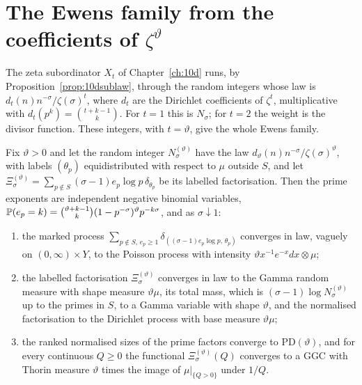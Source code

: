 \section{The Ewens family from the coefficients of \texorpdfstring{$\zeta^\vartheta$}{zeta to the theta}}\label{sec:pdtheta}

The zeta subordinator $X_t$ of Chapter~\ref{ch:10d} runs, by Proposition~\ref{prop:10dsublaw}, through the random integers whose law is $d_t(n)n^{-\sigma}/\zeta(\sigma)^t$, where $d_t$ are the Dirichlet coefficients of $\zeta^t$, multiplicative with $d_t(p^k)=\binom{t+k-1}k$. For $t=1$ this is $N_\sigma$; for $t=2$ the weight is the divisor function. These integers, with $t=\vartheta$, give the whole Ewens family.

\begin{theorem}\label{thm:pdtheta}
Fix $\vartheta>0$ and let the random integer $N_\sigma^{(\vartheta)}$ have the law $d_\vartheta(n)n^{-\sigma}/\zeta(\sigma)^\vartheta$, with labels $(\theta_p)$ equidistributed with respect to $\mu$ outside $S$, and let $\Xi^{(\vartheta)}_\sigma=\sum_{p\notin S}(\sigma-1)e_p\log p\,\delta_{\theta_p}$ be its labelled factorisation. Then the prime exponents are independent negative binomial variables, $\mathbb{P}(e_p=k)=\binom{\vartheta+k-1}k(1-p^{-\sigma})^\vartheta p^{-k\sigma}$, and as $\sigma\downarrow1$:
\begin{enumerate}
\item[(i)] the marked process $\sum_{p\notin S,\,e_p\ge1}\delta_{((\sigma-1)e_p\log p,\,\theta_p)}$ converges in law, vaguely on $(0,\infty)\times Y$, to the Poisson process with intensity $\vartheta x^{-1}e^{-x}dx\otimes\mu$;
\item[(ii)] the labelled factorisation $\Xi^{(\vartheta)}_\sigma$ converges in law to the Gamma random measure with shape measure $\vartheta\mu$, its total mass, which is $(\sigma-1)\log N^{(\vartheta)}_\sigma$ up to the primes in $S$, to a Gamma variable with shape $\vartheta$, and the normalised factorisation to the Dirichlet process with base measure $\vartheta\mu$;
\item[(iii)] the ranked normalised sizes of the prime factors converge to $\mathrm{PD}(\vartheta)$, and for every continuous $Q\ge0$ the functional $\Xi^{(\vartheta)}_\sigma(Q)$ converges to a GGC with Thorin measure $\vartheta$ times the image of $\mu|_{\{Q>0\}}$ under $1/Q$.
\end{enumerate}
\end{theorem}

